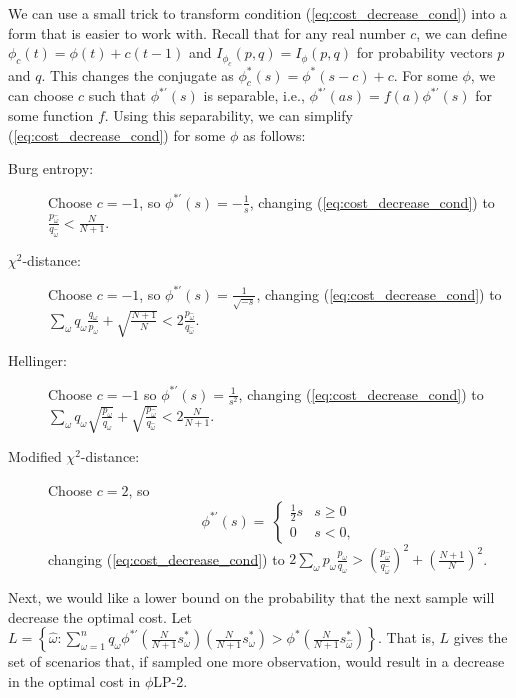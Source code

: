 \documentclass[ijoc,letterpaper]{informs3} %
\newcommand{\plp}{$\phi$LP-2}
\begin{document}
\begin{remark}
	We can use a small trick to transform condition (\ref{eq:cost_decrease_cond}) into a form that is easier to work with.
	Recall that for any real number $c$, we can define $\phi_c(t) = \phi(t) + c(t-1)$ and $I_{\phi_c}(p,q) = I_\phi(p,q)$ for probability vectors $p$ and $q$.
	This changes the conjugate as $\phi_c^*(s) = \phi^*(s-c) + c$.
	For some $\phi$, we can choose $c$ such that $\phi^{*\prime}(s)$ is separable, i.e., $\phi^{*\prime}(as) = f(a) \phi^{*\prime}(s)$ for some function $f$.
	Using this separability, we can simplify (\ref{eq:cost_decrease_cond}) for some $\phi$ as follows:
	\begin{description}
		\item[Burg entropy:] Choose $c = -1$, so $\phi^{*\prime}(s) = -\frac{1}{s}$, changing (\ref{eq:cost_decrease_cond}) to $\frac{p_{\hat{\omega}}}{q_{\hat{\omega}}} < \frac{N}{N+1}$.
		\item[$\chi^2$-distance:] Choose $c = -1$, so $\phi^{*\prime}(s) = \frac{1}{\sqrt{-s}}$, changing (\ref{eq:cost_decrease_cond}) to $\sum_\omega q_\omega \frac{q_\omega}{p_\omega} + \sqrt{\frac{N+1}{N}} < 2 \frac{p_{\hat{\omega}}}{q_{\hat{\omega}}}$.
		\item[Hellinger:] Choose $c = -1$ so $\phi^{*\prime}(s) = \frac{1}{s^2}$, changing (\ref{eq:cost_decrease_cond}) to $\sum_\omega q_\omega \sqrt{\frac{p_\omega}{q_\omega}} + \sqrt{\frac{p_{\hat{\omega}}}{q_{\hat{\omega}}}} < 2 \frac{N}{N+1}$.
		\item[Modified $\chi^2$-distance:] Choose $c = 2$, so
		\[
			\phi^{*\prime}(s) = \
			\begin{cases}
				\frac{1}{2} s & s \geq 0 \\
				0 & s < 0,
			\end{cases}
		\]
		changing (\ref{eq:cost_decrease_cond}) to $2 \sum_\omega p_\omega \frac{p_\omega}{q_\omega} > \left(\frac{p_{\hat{\omega}}}{q_{\hat{\omega}}}\right)^2 + \left(\frac{N+1}{N}\right)^2$.
	\end{description}
\end{remark}




Next, we would like a lower bound on the probability that the next sample will decrease the optimal cost.
Let $L = \left\{ \hat{\omega} : \sum_{\omega=1}^n q_\omega \phi^{*\prime}\left(\frac{N}{N+1}s^*_\omega\right) \left(\frac{N}{N+1}s^*_\omega\right) > \phi^*\left(\frac{N}{N+1}s^*_{\hat{\omega}}\right) \right\}$.
That is, $L$ gives the set of scenarios that, if sampled one more observation, would result in a decrease in the optimal cost in \plp.
\end{document}
